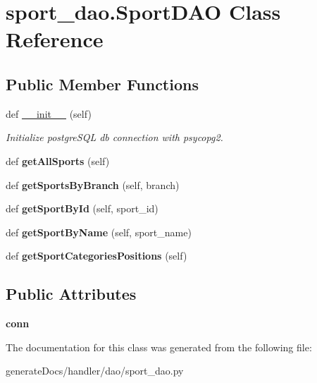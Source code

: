 \hypertarget{classsport__dao_1_1_sport_d_a_o}{}\section{sport\+\_\+dao.\+Sport\+D\+AO Class Reference}
\label{classsport__dao_1_1_sport_d_a_o}
\subsection*{Public Member Functions}
\begin{DoxyCompactItemize}
\item 
\mbox{\label{classsport__dao_1_1_sport_d_a_o_a836fb794d869ace429afe9c14d2ce4e1}} 
def \hyperlink{classsport__dao_1_1_sport_d_a_o_a836fb794d869ace429afe9c14d2ce4e1}{\+\_\+\+\_\+init\+\_\+\+\_\+} (self)
\begin{DoxyCompactList}\small\item\em Initialize postgre\+S\+QL db connection with psycopg2. \end{DoxyCompactList}\item 
\mbox{\label{classsport__dao_1_1_sport_d_a_o_a355c193a51fbb59e94864ef53b0f56f4}} 
def {\bfseries get\+All\+Sports} (self)
\item 
\mbox{\label{classsport__dao_1_1_sport_d_a_o_a2ca7f4b455487c26e6323ef094caf042}} 
def {\bfseries get\+Sports\+By\+Branch} (self, branch)
\item 
\mbox{\label{classsport__dao_1_1_sport_d_a_o_a45556a3686d688fd963f20895e25169a}} 
def {\bfseries get\+Sport\+By\+Id} (self, sport\+\_\+id)
\item 
\mbox{\label{classsport__dao_1_1_sport_d_a_o_abff0c86965de11df18f8ac4899f2b146}} 
def {\bfseries get\+Sport\+By\+Name} (self, sport\+\_\+name)
\item 
\mbox{\label{classsport__dao_1_1_sport_d_a_o_a7d4d0cb496ec7294502f5575bce643ec}} 
def {\bfseries get\+Sport\+Categories\+Positions} (self)
\end{DoxyCompactItemize}
\subsection*{Public Attributes}
\begin{DoxyCompactItemize}
\item 
\mbox{\label{classsport__dao_1_1_sport_d_a_o_ad2226e27d72a83d200a1c9462e4b8956}} 
{\bfseries conn}
\end{DoxyCompactItemize}


The documentation for this class was generated from the following file\+:\begin{DoxyCompactItemize}
\item 
generate\+Docs/handler/dao/sport\+\_\+dao.\+py\end{DoxyCompactItemize}
